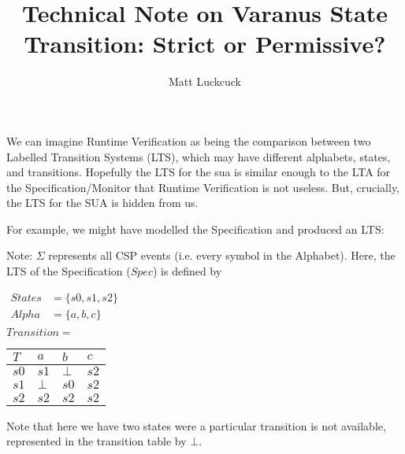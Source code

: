 \documentclass[12pt,a4paper]{article}
\title{Technical Note on Varanus State Transition: Strict or Permissive?}
\author{Matt Luckcuck}
\begin{document}
\maketitle

We can imagine Runtime Verification as being the comparison between two Labelled Transition Systems (LTS), which may have different alphabets, states, and transitions. Hopefully the LTS for the \gls{sua} is similar enough to the LTA for the Specification/Monitor that Runtime Verification is not useless. But, crucially, the LTS for the SUA is hidden from us.

For example, we might have modelled the Specification and produced an LTS:
\begin{center}
\end{center}
\noindent Note: $\Sigma$ represents all CSP events (i.e. every symbol in the Alphabet). Here, the LTS of the Specification ($Spec$) is defined by\\
\begin{center}
$\begin{array}{ll}
States &= \{ s0, s1, s2 \} \\
Alpha &= \{a, b, c\} \\
\end{array} 
$
\\
$Transition = $
\begin{tabular}{l|l|l|l}
$T$  &  $a$ & $b$ & $c$ \\
\hline
$s0$ & $s1$ & $\bot$ & $s2$ \\
$s1$ & $\bot$ & $s0$ & $s2$ \\ 
$s2$ & $s2$ & $s2$ &$s2$ \\
\end{tabular}
\end{center}
Note that here we have two states were a particular transition is not available, represented in the transition table by $\bot$.
 
\end{document}
